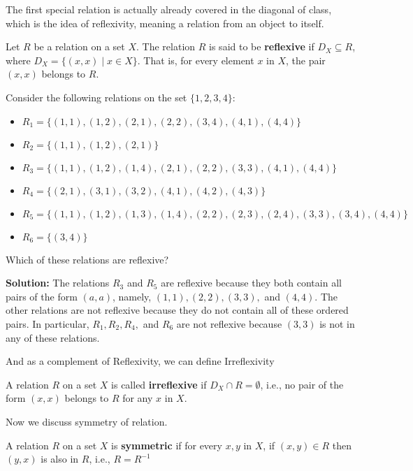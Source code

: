 The first special relation is actually already covered in the diagonal of class, which is the idea of reflexivity, meaning a relation from an object to itself.
\begin{definition}
	Let \( R \) be a relation on a set \( X \). The relation \( R \) is said to be \textbf{reflexive} if \( D_X \subseteq R \), where \( D_X = \{(x, x) \mid x \in X\} \). That is, for every element \( x \) in \( X \), the pair \( (x, x) \) belongs to \( R \).
\end{definition}
\begin{example}
	Consider the following relations on the set \(\{1, 2, 3, 4\}\):
	
	\begin{itemize}
		\item \( R_1 = \{(1, 1), (1, 2), (2, 1), (2, 2), (3, 4), (4, 1), (4, 4)\} \)
		\item \( R_2 = \{(1, 1), (1, 2), (2, 1)\} \)
		\item \( R_3 = \{(1, 1), (1, 2), (1, 4), (2, 1), (2, 2), (3, 3), (4, 1), (4, 4)\} \)
		\item \( R_4 = \{(2, 1), (3, 1), (3, 2), (4, 1), (4, 2), (4, 3)\} \)
		\item \( R_5 = \{(1, 1), (1, 2), (1, 3), (1, 4), (2, 2), (2, 3), (2, 4), (3, 3), (3, 4), (4, 4)\} \)
		\item \( R_6 = \{(3, 4)\} \)
	\end{itemize}
	
	Which of these relations are reflexive?
	
	\textbf{Solution:} The relations \( R_3 \) and \( R_5 \) are reflexive because they both contain all pairs of the form \( (a, a) \), namely, \( (1, 1), (2, 2), (3, 3), \) and \( (4, 4) \). The other relations are not reflexive because they do not contain all of these ordered pairs. In particular, \( R_1, R_2, R_4, \) and \( R_6 \) are not reflexive because \( (3, 3) \) is not in any of these relations.
\end{example}
And as a complement of Reflexivity, we can define Irreflexivity
\begin{definition}
	A relation \( R \) on a set \( X \) is called \textbf{irreflexive} if \( D_X \cap R = \emptyset \), i.e., no pair of the form \( (x, x) \) belongs to \( R \) for any \( x \) in \( X \).
\end{definition}

Now we discuss symmetry of relation.
\begin{definition}
	A relation \( R \) on a set \( X \) is \textbf{symmetric} if for every \( x, y \) in \( X \), if \( (x, y) \in R \) then \( (y, x) \) is also in \( R \), i.e., $R = R^{-1}$
\end{definition}

